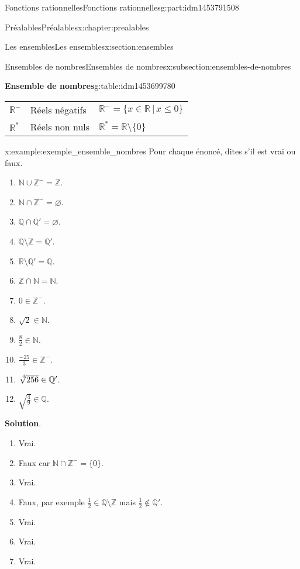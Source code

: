 \documentclass[oneside,10pt,]{book}
\newcommand{\blocktitlefont}{\relax}
\newcommand{\telque}{ \,|\, }
\begin{document}
\begin{partptx}{Fonctions rationnelles}{}{Fonctions rationnelles}{}{}{g:part:idm1453791508}
\begin{chapterptx}{Préalables}{}{Préalables}{}{}{x:chapter:prealables}
\begin{sectionptx}{Les ensembles}{}{Les ensembles}{}{}{x:section:ensembles}
\begin{subsectionptx}{Ensembles de nombres}{}{Ensembles de nombres}{}{}{x:subsection:ensembles-de-nombres}
\begin{tableptx}{\textbf{Ensemble de nombres}}{g:table:idm1453699780}{}
{\begin{tabular}{lll}
\(\mathbb{R}^{-}\)&Réels négatifs&\(\mathbb{R}^{-} = \{x \in \mathbb{R} \telque x \leqslant 0\}\)\tabularnewline[0pt]
\(\mathbb{R}^{*}\)&Réels non nuls&\(\mathbb{R}^{*} = \mathbb{R} \setminus \{0\}\)
\end{tabular}
}%
\end{tableptx}%
%
\par
\begin{example}{}{x:example:exemple_ensemble_nombres}%
Pour chaque énoncé, dites s'il est vrai ou faux.%
\par
%
\begin{multicols}{3}
\begin{enumerate}
\item{}\(\mathbb{N} \cup \mathbb{Z}^{-} = \mathbb{Z}\).%
\item{}\(\mathbb{N} \cap \mathbb{Z}^{-} = \varnothing\).%
\item{}\(\mathbb{Q} \cap \mathbb{Q}' = \varnothing\).%
\item{}\(\mathbb{Q} \setminus \mathbb{Z} = \mathbb{Q}'\).%
\item{}\(\mathbb{R} \setminus \mathbb{Q}' = \mathbb{Q}\).%
\item{}\(\mathbb{Z} \cap \mathbb{N} = \mathbb{N}\).%
\item{}\(0 \in \mathbb{Z}^{-}\).%
\item{}\(\sqrt{2} \in \mathbb{N}\).%
\item{}\(\frac{8}{2} \in \mathbb{N}\).%
\item{}\(\frac{-25}{3} \in \mathbb{Z}^{-}\).%
\item{}\(\sqrt[\leftroot{-2}\uproot{2}4]{256} \in \mathbb{Q}'\).%
\item{}\(\sqrt{\frac{4}{9}} \in \mathbb{Q}\).%
\end{enumerate}
\end{multicols}
%
\par\smallskip%
\noindent\textbf{\blocktitlefont Solution}.\hypertarget{g:solution:idm1453665580}{}\quad{}%
\begin{enumerate}
\item{}Vrai.%
\item{}Faux car \(\mathbb{N} \cap \mathbb{Z}^{-} = \{0\}\).%
\item{}Vrai.%
\item{}Faux, par exemple \(\frac{1}{2} \in \mathbb{Q} \setminus \mathbb{Z}\) mais \(\frac{1}{2} \notin \mathbb{Q}'\).%
\item{}Vrai.%
\item{}Vrai.%
\item{}Vrai.%

\end{enumerate}
\end{example}
\end{subsectionptx}
\end{sectionptx}
\end{chapterptx}
\end{partptx}
\end{document}
